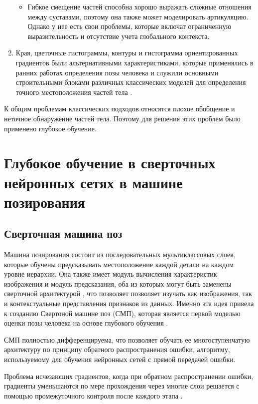\begin{enumerate}[label=\arabic*)]
\begin{itemize}
 			\item Гибкое смещение частей способна хорошо выражать сложные отношения между суставами, поэтому она также может моделировать артикуляцию.
 			Однако у нее есть свои проблемы, которые включат ограниченную выразительность и отсутствие учета глобального контекста.
 			
 				
 		\end{itemize}
 		
 		
 	\item Края, цветочные гистограммы, контуры и гистограмма ориентированных градиентов были альтернативными характеристиками, которые применялись в ранних работах определения позы человека и служили основными строительными блоками различных классических моделей для определения точного местоположения частей тела \cite{polygraphic}. 
\end{enumerate}

К общим проблемам классических подходов относятся плохое обобщение и неточное обнаружение частей тела. Поэтому для решения этих проблем было применено глубокое обучение.

\section{Глубокое обучение в сверточных нейронных сетях в машине позирования}

\subsection{Сверточная машина поз}

Машина позирования состоит из последовательных мультиклассовых слоев, которые обучены предсказывать местоположение каждой детали на каждом уровне иерархии. Она также имеет модуль вычисления характеристик изображения и модуль предсказания, оба из которых могут быть заменены сверточной архитектурой \cite{CNN}, что позволяет позволяет изучать как изображения, так и контекстуальные представления признаков из данных.
Именно эта идея привела к созданию Свертоной машине поз (СМП), которая является первой моделью оценки позы человека на основе глубокого обучения \cite{wei2016cpm}.

СМП полностью дифференцируема, что позволяет обучать ее многоступенчатую архитектуру по принципу обратного распространения ошибки, алгоритму, используемому для обучения нейронных сетей с прямой передачей ошибки.

Проблема исчезающих градиентов, когда при обратном распространении ошибки, градиенты уменьшаются по мере прохождения через многие слои решается с помощью промежуточного контроля после каждого этапа \cite{wei2016cpm}.


